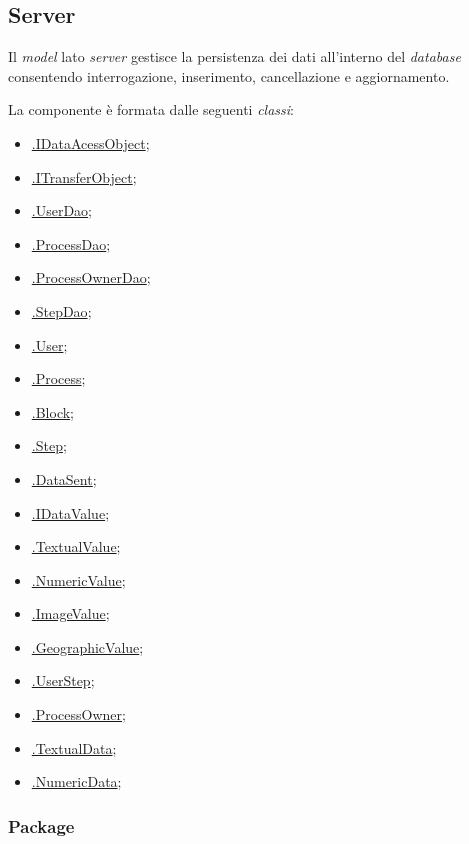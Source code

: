 \subsection{Server}

Il \textit{model} lato \textit{server} gestisce la persistenza dei dati all'interno del \textit{database} consentendo interrogazione, inserimento, cancellazione e aggiornamento.

La componente è formata dalle seguenti \textit{classi}:
\begin{itemize}
	\item \hyperref[idataacessobject]{\smodel{}.IDataAcessObject};
	\item \hyperref[itransferobject]{\smodel{}.ITransferObject};
	\item \hyperref[userdao]{\smodel{}.UserDao};
	\item \hyperref[processdao]{\smodel{}.ProcessDao};
	\item \hyperref[processownerdao]{\smodel{}.ProcessOwnerDao};
	\item \hyperref[stepdao]{\smodel{}.StepDao};
	\item \hyperref[botuser]{\smodel{}.User};
	\item \hyperref[botprocess]{\smodel{}.Process};
	\item \hyperref[botblock]{\smodel{}.Block};
	\item \hyperref[botstep]{\smodel{}.Step};
	\item \hyperref[botdatasent]{\smodel{}.DataSent};
	\item \hyperref[botidatavalue]{\smodel{}.IDataValue};
	\item \hyperref[bottextualvalue]{\smodel{}.TextualValue};
	\item \hyperref[botnumericvalue]{\smodel{}.NumericValue};
	\item \hyperref[botimagevalue]{\smodel{}.ImageValue};
	\item \hyperref[botgeographicvalue]{\smodel{}.GeographicValue};
	\item \hyperref[botuserstep]{\smodel{}.UserStep};
	\item \hyperref[botpowner]{\smodel{}.ProcessOwner};
	\item \hyperref[bottextualdata]{\smodel{}.TextualData};
	\item \hyperref[botnumericdata]{\smodel{}.NumericData};
\end{itemize}

\subsubsection{Package \model{}}

